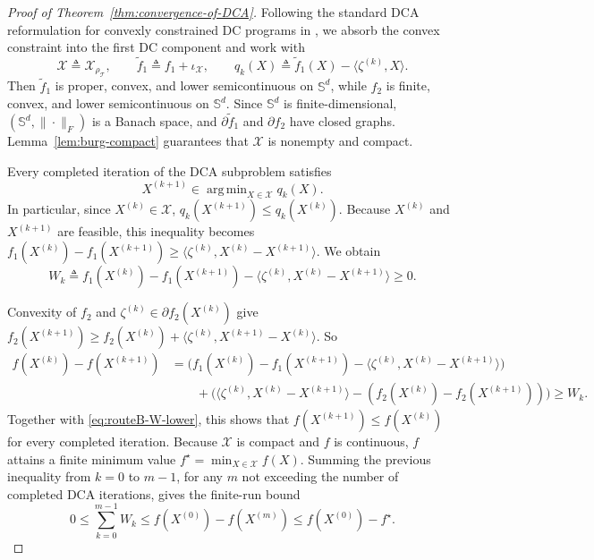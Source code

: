 \documentclass[11pt, letterpaper, oneside, reqno]{amsart}
\DeclareMathOperator*{\argmin}{arg\,min}
\newcommand{\opt}{^\star}
\newcommand{\inner}[2]{\big \langle #1, #2 \big \rangle }
\newcommand{\Let}{\triangleq}
\begin{document}
\begin{proof}[Proof of Theorem~\ref{thm:convergence-of-DCA}]
Following the standard DCA reformulation for convexly constrained DC programs in \cite[Section~1]{ref:le2014dc}, we absorb the convex constraint into the first DC component and work with
\[
\mathcal X \Let \mathcal X_{\rho_{\mathcal T}},
\qquad \tilde f_1 \Let f_1 + \iota_{\mathcal X},
\qquad q_k(X) \Let \tilde f_1(X) - \inner{\zeta^{(k)}}{X}.
\]
Then $\tilde f_1$ is proper, convex, and lower semicontinuous on $\mathbb S^d$, while $f_2$ is finite, convex, and lower semicontinuous on $\mathbb S^d$. Since $\mathbb S^d$ is finite-dimensional, $(\mathbb S^d,\|\cdot\|_F)$ is a Banach space, and $\partial \tilde f_1$ and $\partial f_2$ have closed graphs. Lemma~\ref{lem:burg-compact} guarantees that $\mathcal X$ is nonempty and compact.

Every completed iteration of the DCA subproblem satisfies
\begin{equation}
\label{eq:qk_iteration}
X^{(k+1)} \in \argmin_{X\in\mathcal X} q_k(X).
\end{equation}
In particular, since $X^{(k)}\in\mathcal X$,
$q_k(X^{(k+1)}) \le q_k(X^{(k)})$.
Because $X^{(k)}$ and $X^{(k+1)}$ are feasible, this inequality becomes
$f_1(X^{(k)}) - f_1(X^{(k+1)})
\ge \inner{\zeta^{(k)}}{X^{(k)} - X^{(k+1)}}$.
We obtain
\begin{equation}
\label{eq:routeB-W-lower}
W_k
\Let f_1(X^{(k)}) - f_1(X^{(k+1)}) - \inner{\zeta^{(k)}}{X^{(k)} - X^{(k+1)}} \ge 0.
\end{equation}

Convexity of $f_2$ and $\zeta^{(k)} \in \partial f_2(X^{(k)})$ give
$f_2(X^{(k+1)}) \ge f_2(X^{(k)}) + \inner{\zeta^{(k)}}{X^{(k+1)} - X^{(k)}}$.
So 
\[
\begin{aligned}
f(X^{(k)}) - f(X^{(k+1)})
&= \bigl(f_1(X^{(k)}) - f_1(X^{(k+1)}) - \inner{\zeta^{(k)}}{X^{(k)} - X^{(k+1)}}\bigr) \\ 
&\qquad + \bigl(\inner{\zeta^{(k)}}{X^{(k)} - X^{(k+1)}} - (f_2(X^{(k)}) - f_2(X^{(k+1)}))\bigr)
\ge W_k.
\end{aligned}
\]
Together with \eqref{eq:routeB-W-lower}, this shows that $f(X^{(k+1)})\le f(X^{(k)})$ for every completed iteration.
Because $\mathcal X$ is compact and $f$ is continuous, $f$ attains a finite minimum value $f\opt = \min_{X \in \mathcal X} f(X)$.
Summing the previous inequality from $k = 0$ to $m-1$, for any $m$ not exceeding the number of completed DCA iterations, gives the finite-run bound
\[
0\le \sum_{k=0}^{m-1} W_k
\le f(X^{(0)}) - f(X^{(m)})
\le f(X^{(0)}) - f\opt.
\]


\end{proof}
\end{document}
